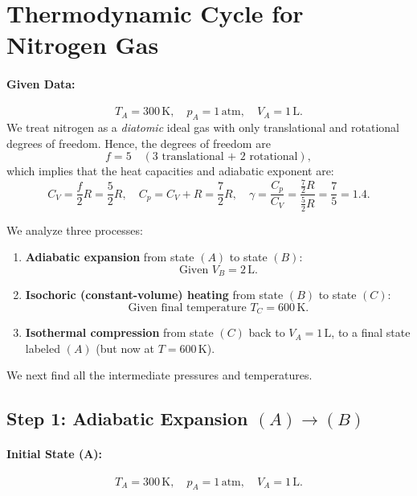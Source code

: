 \documentclass[12pt]{article}
\title{}
\author{Jerich Lee}
\date{\today}
\theoremstyle{definition} %
\theoremstyle{plain} %
\begin{document}
\maketitle
\section*{Thermodynamic Cycle for Nitrogen Gas}

\paragraph{Given Data:}

\[
T_A = 300\,\mathrm{K}, \quad p_A = 1\,\mathrm{atm}, \quad V_A = 1\,\mathrm{L}.
\]
We treat nitrogen as a \emph{diatomic} ideal gas with only translational and rotational degrees of freedom. Hence, the degrees of freedom are
\[
f = 5 \quad (\text{3 translational + 2 rotational}),
\]
which implies that the heat capacities and adiabatic exponent are:
\[
C_V = \frac{f}{2} R = \frac{5}{2}R, 
\quad
C_p = C_V + R = \frac{7}{2}R,
\quad
\gamma = \frac{C_p}{C_V} 
       = \frac{\frac{7}{2}R}{\frac{5}{2}R}
       = \frac{7}{5} = 1.4.
\]

We analyze three processes:

\begin{enumerate}
\item \textbf{Adiabatic expansion} from state $(A)$ to state $(B)$:
  \[
    \text{Given } V_B = 2\,\mathrm{L}.
  \]
\item \textbf{Isochoric (constant-volume) heating} from state $(B)$ to state $(C)$:
  \[
    \text{Given final temperature } T_C = 600\,\mathrm{K}.
  \]
\item \textbf{Isothermal compression} from state $(C)$ back to $V_A=1\,\mathrm{L}$, to a final state labeled $(A)$ (but now at $T=600\,\mathrm{K}$).
\end{enumerate}

We next find all the intermediate pressures and temperatures.

\subsection*{Step 1: Adiabatic Expansion $(A)\to(B)$}

\paragraph{Initial State (A):}
\[
T_A = 300\,\mathrm{K}, \quad p_A = 1\,\mathrm{atm}, \quad V_A = 1\,\mathrm{L}.
\]
\end{document}
